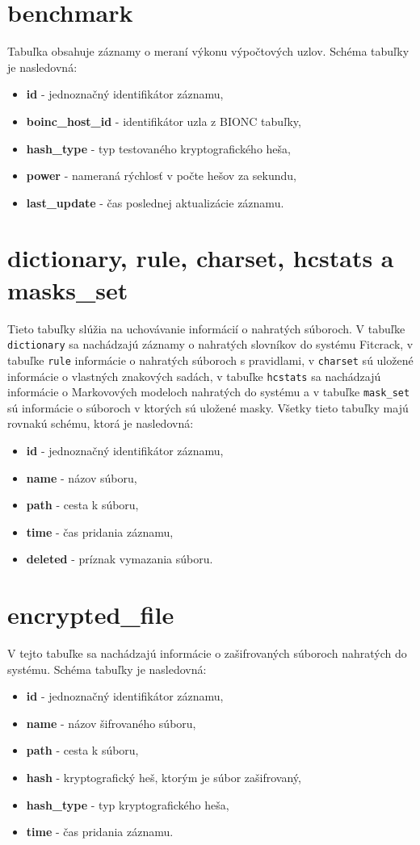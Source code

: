 \documentclass[zadani,slovak]{fitthesis}
\begin{document}
\section{benchmark}
Tabuľka obsahuje záznamy o meraní výkonu výpočtových uzlov. Schéma tabuľky je nasledovná:
\begin{itemize}
\item \textbf{id} - jednoznačný identifikátor záznamu,
\item \textbf{boinc\_host\_id} - identifikátor uzla z BIONC tabuľky,
\item \textbf{hash\_type} -  typ testovaného kryptografického heša,
\item \textbf{power} - nameraná rýchlosť v počte hešov za sekundu,
\item \textbf{last\_update} - čas poslednej aktualizácie záznamu.
\end{itemize}

\section{dictionary, rule, charset, hcstats a masks\_set}
Tieto tabuľky slúžia na uchovávanie informácií o nahratých súboroch. V tabuľke \texttt{dictionary} sa nachádzajú záznamy o nahratých slovníkov do systému Fitcrack, v tabuľke \texttt{rule} informácie o nahratých súboroch s pravidlami, v \texttt{charset} sú uložené informácie o vlastných znakových sadách, v tabuľke \texttt{hcstats} sa nachádzajú informácie o Markovových modeloch nahratých do systému a v tabuľke \texttt{mask\_set} sú informácie o súboroch v ktorých sú uložené masky. Všetky tieto tabuľky majú rovnakú schému, ktorá je nasledovná:

\begin{itemize}
    \item \textbf {id} - jednoznačný identifikátor záznamu,
    \item \textbf {name} - názov súboru,
    \item \textbf {path} - cesta k súboru,
    \item \textbf {time} - čas pridania záznamu,
    \item \textbf {deleted} - príznak vymazania súboru.
\end{itemize}


\section{encrypted\_file}
V tejto tabuľke sa nachádzajú informácie o zašifrovaných súboroch nahratých do systému.  Schéma tabuľky je nasledovná:
\begin{itemize}
    \item \textbf {id} - jednoznačný identifikátor záznamu,
    \item \textbf {name} - názov šifrovaného súboru,
    \item \textbf {path} - cesta k súboru,
    \item \textbf {hash} - kryptografický heš, ktorým je súbor zašifrovaný,
    \item \textbf {hash\_type} - typ kryptografického heša,
    \item \textbf {time} - čas pridania záznamu.
\end{itemize}
\end{document}
